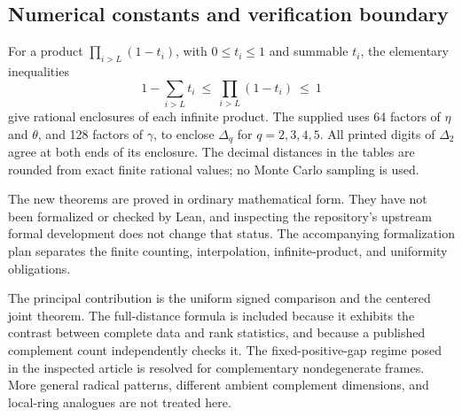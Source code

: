\subsection{Numerical constants and verification boundary}

For a product \(\prod_{i>L}(1-t_i)\), with \(0\le t_i\le1\) and summable
\(t_i\), the elementary inequalities
\[
 1-\sum_{i>L}t_i\ \le\ \prod_{i>L}(1-t_i)\ \le\ 1
\]
give rational enclosures of each infinite product.
The supplied  uses 64 factors
of \(\eta\) and \(\theta\), and 128 factors of \(\gamma\), to enclose
\(\Delta_q\) for \(q=2,3,4,5\).
All printed digits of \(\Delta_2\) agree at both ends of its enclosure.
The decimal distances in the tables are rounded from exact finite
rational values; no Monte Carlo sampling is used.

The new theorems are proved in ordinary mathematical form.
They have not been formalized or checked by Lean, and inspecting the
repository's upstream formal development does not change that status.
The accompanying formalization plan separates the finite counting,
interpolation, infinite-product, and uniformity obligations.

The principal contribution is the uniform signed comparison and the
centered joint theorem. The full-distance formula is included because
it exhibits the contrast between complete data and rank statistics,
and because a published complement count independently checks it.
The fixed-positive-gap regime posed in the inspected article is
resolved for complementary nondegenerate frames. More general radical
patterns, different ambient complement dimensions, and local-ring
analogues are not treated here.

